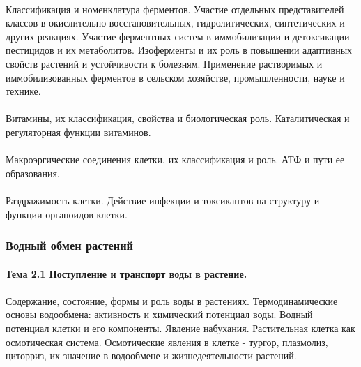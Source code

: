 \paragraph*{}Классификация и номенклатура ферментов. Участие отдельных представителей классов в окислительно-восстановительных, гидролитических, синтетических и других реакциях. Участие ферментных систем в иммобилизации и детоксикации пестицидов и их метаболитов. Изоферменты и их роль в повышении адаптивных свойств растений и устойчивости к болезням. Применение растворимых и иммобилизованных ферментов в сельском хозяйстве, промышленности, науке и технике.

\paragraph*{}Витамины, их классификация, свойства и биологическая роль. Каталитическая и регуляторная функции витаминов.

\paragraph*{}Макроэргические соединения клетки, их классификация и роль. АТФ и пути ее образования.

\paragraph*{}Раздражимость клетки. Действие инфекции и токсикантов на структуру и функции органоидов клетки. 

\subsubsection{Водный обмен растений}

\paragraph*{Тема 2.1 Поступление и транспорт воды в растение.}

\paragraph*{}Содержание, состояние, формы и роль воды в растениях. Термодинамические основы водообмена: активность и химический потенциал воды. Водный потенциал клетки и его компоненты. Явление набухания. Растительная клетка как осмотическая система. Осмотические явления в клетке - тургор, плазмолиз, циторриз, их значение в водообмене и жизнедеятельности растений.

